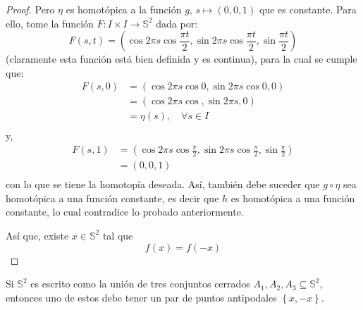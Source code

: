 \documentclass{article}
\newcounter{it}
\theoremstyle{largebreak}
\newcommand\cf[3]{\ensuremath{#1:#2\rightarrow#3}}
\begin{document}
\begin{proof}
        Pero $\eta$ es homotópica a la función $g$, $s\mapsto (0,0,1)$ que es constante. Para ello, tome la función $\cf{F}{I\times I}{\mathbb{S}^2}$ dada por:
        \begin{equation*}
            F(s,t)=\left(\cos 2\pi s\cos\frac{\pi t}{2},\sin 2\pi s\cos\frac{\pi t}{2},\sin\frac{\pi t}{2}\right)
        \end{equation*}
        (claramente esta función está bien definida y es continua), para la cual se cumple que:
        \begin{equation*}
            \begin{split}
                F(s,0)&=\left(\cos 2\pi s\cos0,\sin 2\pi s\cos0,0\right)\\
                &=\left(\cos 2\pi s\cos,\sin 2\pi s,0\right)\\
                &=\eta(s),\quad\forall s\in I\\
            \end{split}
        \end{equation*}
        y,
        \begin{equation*}
            \begin{split}
                F(s,1)&=\left(\cos 2\pi s\cos\frac{\pi}{2},\sin 2\pi s\cos\frac{\pi}{2},\sin\frac{\pi}{2}\right)\\
                &=\left(0,0,1\right)\\
            \end{split}
        \end{equation*}
        con lo que se tiene la homotopía deseada. Así, también debe suceder que $g\circ\eta$ sea homotópica a una función constante, es decir que $h$ es homotópica a una función constante, lo cual contradice lo probado anteriormente.

        Así que, existe $x\in\mathbb{S}^2$ tal que
        \begin{equation*}
            f(x)=f(-x)
        \end{equation*}
    \end{proof}

    \begin{cor}
        Si $\mathbb{S}^2$ es escrito como la unión de tres conjuntos cerrados $A_1,A_2,A_3\subseteq\mathbb{S}^2$, entonces uno de estos debe tener un par de puntos antipodales $\left\{x,-x\right\}$.
    \end{cor}
\end{document}
